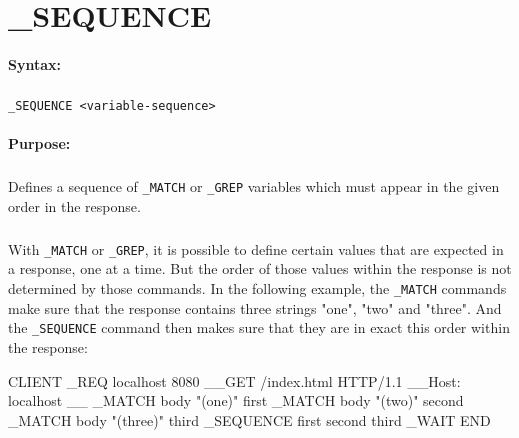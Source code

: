 
\newpage
\section{\_SEQUENCE}
\label{cmd:_SEQUENCE}

\paragraph{Syntax:}
\subparagraph{}
\texttt{\_SEQUENCE <variable-sequence>}

\paragraph{Purpose:}
\subparagraph{}
Defines a sequence of \texttt{\_MATCH} or \texttt{\_GREP} variables which must 
appear in the given order in the response.

\subparagraph{}
With \texttt{\_MATCH} or \texttt{\_GREP}, it is possible to define certain 
values that are expected in a response, one at a time. But the order of 
those values within the response is not determined by those commands. 
In the following example, the \texttt{\_MATCH} commands make sure that 
the response contains three strings "one", "two" and "three". And the 
\texttt{\_SEQUENCE} command then makes sure that they are in exact 
this order within the response:

\begin{usplisting}
    CLIENT
    _REQ localhost 8080
    __GET /index.html HTTP/1.1
    __Host: localhost
    __
    _MATCH body "(one)" first
    _MATCH body "(two)" second
    _MATCH body "(three)" third
    _SEQUENCE first second third
    _WAIT
    END
\end{usplisting}
